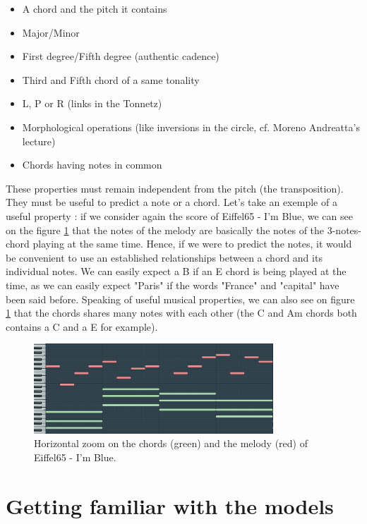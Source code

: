 \documentclass{article}
\begin{document}
\begin{itemize}
\item A chord and the pitch it contains
\item Major/Minor
\item First degree/Fifth degree (authentic cadence)
\item Third and Fifth chord of a same tonality
\item L, P or R (links in the Tonnetz)
\item Morphological operations (like inversions in the circle, cf. Moreno Andreatta's lecture)
\item Chords having notes in common
\end{itemize}

These properties must remain independent from the pitch (the transposition). They must be useful to predict a note or a chord. Let's take an exemple of a useful property : if we consider again the score of Eiffel65 - I'm Blue, we can see on the figure \ref{eiffelfull} that the notes of the melody are basically the notes of the 3-notes-chord playing at the same time. Hence, if we were to predict the notes, it would be convenient to use an established relationships between a chord and its individual notes. We can easily expect a B if an E chord is being played at the time, as we can easily expect "Paris" if the words "France" and "capital" have been said before. Speaking of useful musical properties, we can also see on figure \ref{eiffelfull} that the chords shares many notes with each other (the C and Am chords both contains a C and a E for example).

\begin{figure}[H]
\centering
\includegraphics[width =0.8\textwidth]{eiffelfullmelo.png}
\caption{Horizontal zoom on the chords (green) and the melody (red) of Eiffel65 - I'm Blue.}
\label{eiffelfull}
\end{figure}

\section{Getting familiar with the models}
\end{document}
